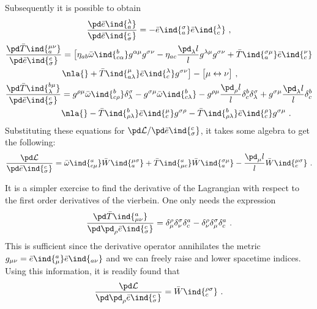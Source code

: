 \documentclass[11pt]{article}
\begin{document}
Subsequently it is possible to obtain
\begin{gather*}
	\frac{\pd \bar{e}\ind{_a^\lambda}}{\pd \bar{e}\ind{^c_\sigma}} 
	= - \bar{e}\ind{_a^\sigma} \bar{e}\ind{_c^\lambda}~,
	\\
	\begin{split}
	\frac{\pd \bar{T}\ind{_a^{\mu\nu}}}{\pd \bar{e}\ind{^c_\sigma}} 
	&= \big[ \eta_{ab} \bar{\omega}\ind{^b_{c\alpha}} g^{\alpha\mu} 
	g^{\sigma\nu} - \eta_{ac} \frac{\pd_\lambda l}{l} 
	g^{\lambda\mu} g^{\sigma\nu} + \bar{T}\ind{_a^{\sigma\mu}} 
	\bar{e}\ind{_c^\nu} \\
	&\nla{}+ \bar{T}\ind{_{a\lambda}^\mu} \bar{e}\ind{_c^\lambda} 
	g^{\sigma\nu} \big] - \big[ \mu \leftrightarrow \nu \big]~,
	\end{split}
	\\
	\begin{split}
	\frac{\pd \bar{T}\ind{^{b\mu}_\lambda}}{\pd 
		\bar{e}\ind{^c_\sigma}}
	&= g^{\rho\mu} \bar{\omega}\ind{^b_{c\rho}} 
	\delta^\sigma_\lambda - g^{\sigma\mu} 
	\bar{\omega}\ind{^b_{c\lambda}} - g^{\rho\mu} \frac{\pd_\rho 
		l}{l} \delta^b_c \delta^\sigma_\lambda + g^{\sigma\mu} 
	\frac{\pd_\lambda l}{l} \delta^b_c \\
	&\nla{}- \bar{T}\ind{^b_{\rho\lambda}} \bar{e}\ind{_c^\mu} 
	g^{\sigma\rho} - \bar{T}\ind{^b_{\rho\lambda}} 
	\bar{e}\ind{_c^\rho} g^{\sigma\mu}~.
	\end{split}
\end{gather*}
Substituting these equations for $\pd \mathcal{L}/\pd 
\bar{e}\ind{^c_\sigma}$, it takes some algebra to get the 
following:
\begin{equation}
	\frac{\pd \mathcal{L}}{\pd \bar{e}\ind{^c_\sigma}}
	= \bar{\omega}\ind{^a_{c\mu}} \bar{W}\ind{_a^{\mu\sigma}} + 
	\bar{T}\ind{^a_{\mu c}} \bar{W}\ind{_a^{\sigma\mu}} - 
	\frac{\pd_\mu l}{l} \bar{W}\ind{_c^{\mu\sigma}}~.
\end{equation}

It is a simpler exercise to find the derivative of the Lagrangian 
with respect to the first order derivatives of the vierbein. One 
only needs the expression
\begin{displaymath}
	\frac{\pd \bar{T}\ind{^a_{\mu\nu}}}{\pd\pd_\rho 
		\bar{e}\ind{^c_\sigma}} = \delta^\rho_\mu \delta^\sigma_\nu 
	\delta^a_c - \delta^\rho_\nu \delta^\sigma_\mu \delta^a_c~.
\end{displaymath}
This is sufficient since the derivative operator annihilates the 
metric $g_{\mu\nu} = \bar{e}\ind{^a_\mu}\bar{e}\ind{_{a\nu}}$ and 
we can freely raise and lower spacetime indices. Using this 
information, it is readily found that
\begin{equation}
	\frac{\pd \mathcal{L}}{\pd\pd_\rho \bar{e}\ind{^c_\sigma}} = 
	\bar{W}\ind{_c^{\rho\sigma}}~.
\end{equation}

\newpage


%
\end{document}
